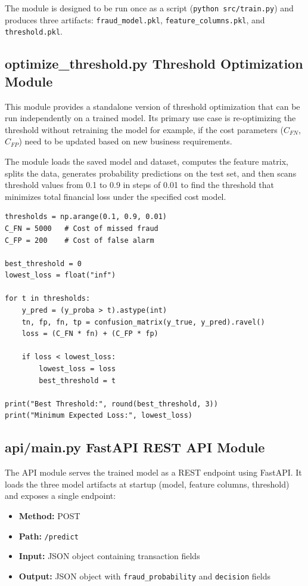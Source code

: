 The module is designed to be run once as a script (\texttt{python src/train.py}) and produces three artifacts: \texttt{fraud\_model.pkl}, \texttt{feature\_columns.pkl}, and \texttt{threshold.pkl}.

\subsection{optimize\_threshold.py Threshold Optimization Module}

This module provides a standalone version of threshold optimization that can be run independently on a trained model. Its primary use case is re-optimizing the threshold without retraining the model for example, if the cost parameters ($C_{FN}$, $C_{FP}$) need to be updated based on new business requirements.

The module loads the saved model and dataset, computes the feature matrix, splits the data, generates probability predictions on the test set, and then scans threshold values from 0.1 to 0.9 in steps of 0.01 to find the threshold that minimizes total financial loss under the specified cost model.

\begin{lstlisting}[caption={Core threshold optimization loop from optimize\_threshold.py}, label={lst:thresh_loop}]
thresholds = np.arange(0.1, 0.9, 0.01)
C_FN = 5000   # Cost of missed fraud
C_FP = 200    # Cost of false alarm

best_threshold = 0
lowest_loss = float("inf")

for t in thresholds:
    y_pred = (y_proba > t).astype(int)
    tn, fp, fn, tp = confusion_matrix(y_true, y_pred).ravel()
    loss = (C_FN * fn) + (C_FP * fp)

    if loss < lowest_loss:
        lowest_loss = loss
        best_threshold = t

print("Best Threshold:", round(best_threshold, 3))
print("Minimum Expected Loss:", lowest_loss)
\end{lstlisting}

\subsection{api/main.py FastAPI REST API Module}

The API module serves the trained model as a REST endpoint using FastAPI. It loads the three model artifacts at startup (model, feature columns, threshold) and exposes a single endpoint:

\begin{itemize}
    \item \textbf{Method:} POST
    \item \textbf{Path:} \texttt{/predict}
    \item \textbf{Input:} JSON object containing transaction fields
    \item \textbf{Output:} JSON object with \texttt{fraud\_probability} and \texttt{decision} fields
\end{itemize}

